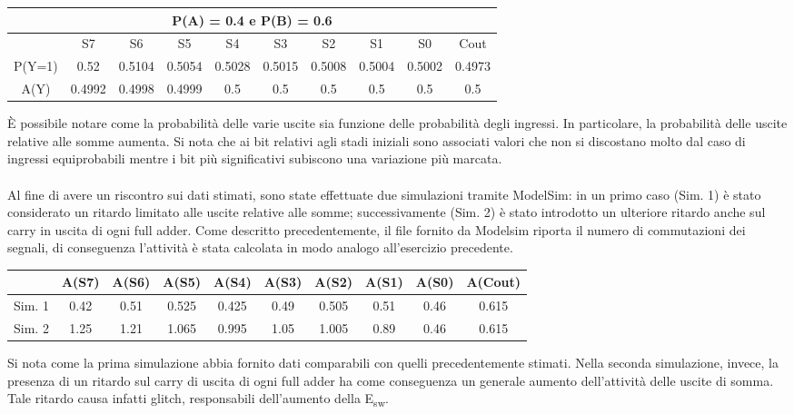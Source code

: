 \documentclass[11pt,  english, makeidx, a4paper, titlepage, oneside]{book}
\begin{document}
\vspace{0.3cm}
\begin{center}
\begin{tabular}{|c|c|c|c|c|c|c|c|c|c|}
\hline
\multicolumn{10}{|c|}{P(A) = 0.4 e P(B) = 0.6}\\
\hline
 & S7 & S6 & S5 & S4 & S3 & S2 & S1 & S0 & Cout \\
\hline
P(Y=1) & 0.52 & 0.5104 & 0.5054 & 0.5028 & 0.5015 & 0.5008 & 0.5004 & 0.5002 & 0.4973 \\
\hline
A(Y) & 0.4992 & 0.4998 & 0.4999 & 0.5 & 0.5 & 0.5 & 0.5 & 0.5 & 0.5 \\
\hline
\end{tabular}
\end{center}
\vspace{0.3cm}
È possibile notare come la probabilità delle varie uscite sia funzione delle probabilità degli ingressi.
In particolare, la probabilità delle uscite relative alle somme aumenta. Si nota che ai bit relativi agli stadi iniziali sono associati valori che non si discostano molto dal caso di ingressi equiprobabili mentre i bit più significativi subiscono una variazione più marcata.\\\\
Al fine di avere un riscontro sui dati stimati, sono state effettuate due simulazioni tramite ModelSim: in un primo caso (Sim. 1) è stato considerato un ritardo limitato alle uscite relative alle somme; successivamente (Sim. 2) è stato introdotto un ulteriore ritardo anche sul carry in uscita di ogni full adder.
Come descritto precedentemente, il file fornito da Modelsim riporta il numero di commutazioni dei segnali, di conseguenza l'attività è stata calcolata in modo analogo all'esercizio precedente.\\
\vspace{0.3cm}
\begin{center}
\begin{tabular}{|c|c|c|c|c|c|c|c|c|c|}
\hline
 & A(S7) & A(S6) & A(S5) & A(S4) & A(S3) & A(S2) & A(S1) & A(S0) & A(Cout) \\
\hline
Sim. 1 & 0.42 & 0.51 & 0.525 & 0.425 & 0.49 & 0.505 & 0.51 & 0.46 & 0.615 \\
\hline
Sim. 2 & 1.25 & 1.21 & 1.065 & 0.995 & 1.05 & 1.005 & 0.89 & 0.46 & 0.615 \\
\hline
\end{tabular}
\end{center}
\vspace{0.3cm}
Si nota come la prima simulazione abbia fornito dati comparabili con quelli precedentemente stimati. Nella seconda simulazione, invece, la presenza di un ritardo sul carry di uscita di ogni full adder ha come conseguenza un generale aumento dell'attività delle uscite di somma. Tale ritardo causa infatti glitch, responsabili dell'aumento della E\textsubscript{sw}.
\end{document}
